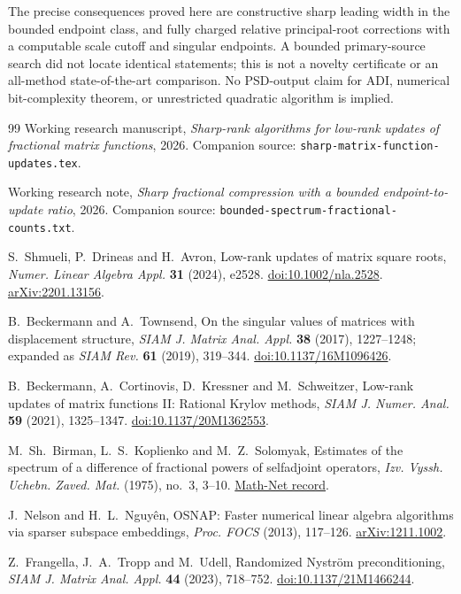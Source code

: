 \documentclass[11pt]{article}
\numberwithin{equation}{section}
\begin{document}
The precise consequences proved here are constructive sharp leading
width in the bounded endpoint class, and fully charged relative
principal-root corrections with a computable scale cutoff and singular
endpoints. A bounded primary-source search did not locate identical
statements; this is not a novelty certificate or an all-method
state-of-the-art comparison. No PSD-output claim for ADI, numerical
bit-complexity theorem, or unrestricted quadratic algorithm is implied.

\begin{thebibliography}{99}
Working research manuscript,
\emph{Sharp-rank algorithms for low-rank updates of fractional matrix
functions}, 2026. Companion source:
\texttt{sharp-matrix-function-updates.tex}.

Working research note,
\emph{Sharp fractional compression with a bounded endpoint-to-update
ratio}, 2026. Companion source:
\texttt{bounded-spectrum-fractional-counts.txt}.

S.~Shmueli, P.~Drineas and H.~Avron,
Low-rank updates of matrix square roots,
\emph{Numer. Linear Algebra Appl.} \textbf{31} (2024), e2528.
\href{https://doi.org/10.1002/nla.2528}{doi:10.1002/nla.2528}.
\href{https://arxiv.org/abs/2201.13156}{arXiv:2201.13156}.

B.~Beckermann and A.~Townsend,
On the singular values of matrices with displacement structure,
\emph{SIAM J. Matrix Anal. Appl.} \textbf{38} (2017), 1227--1248;
expanded as \emph{SIAM Rev.} \textbf{61} (2019), 319--344.
\href{https://doi.org/10.1137/16M1096426}{doi:10.1137/16M1096426}.

B.~Beckermann, A.~Cortinovis, D.~Kressner and M.~Schweitzer,
Low-rank updates of matrix functions II: Rational Krylov methods,
\emph{SIAM J. Numer. Anal.} \textbf{59} (2021), 1325--1347.
\href{https://doi.org/10.1137/20M1362553}{doi:10.1137/20M1362553}.

M.~Sh.~Birman, L.~S.~Koplienko and M.~Z.~Solomyak,
Estimates of the spectrum of a difference of fractional powers of
selfadjoint operators, \emph{Izv. Vyssh. Uchebn. Zaved. Mat.}
(1975), no.~3, 3--10.
\href{https://www.mathnet.ru/eng/ivm6330}{Math-Net record}.

J.~Nelson and H.~L.~Nguy\^en,
OSNAP: Faster numerical linear algebra algorithms via sparser subspace
embeddings, \emph{Proc. FOCS} (2013), 117--126.
\href{https://arxiv.org/abs/1211.1002}{arXiv:1211.1002}.

Z.~Frangella, J.~A.~Tropp and M.~Udell,
Randomized Nystr\"om preconditioning,
\emph{SIAM J. Matrix Anal. Appl.} \textbf{44} (2023), 718--752.
\href{https://doi.org/10.1137/21M1466244}{doi:10.1137/21M1466244}.
\end{thebibliography}
\end{document}
